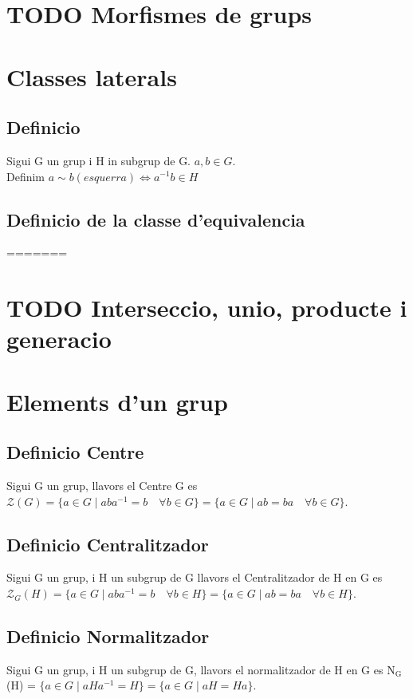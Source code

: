 \documentclass[11pt]{article}
\begin{document}
\section{{\bfseries\sffamily TODO} Morfismes de grups}
\label{sec:org1005c95}
\section{Classes laterals}
\label{sec:org1e25445}
\subsection{Definicio}
\label{sec:orgacf7c2a}
Sigui G un grup i H in subgrup de G. \(a,b \in G\). \\
Definim \(a \sim b (esquerra) \iff a^{-1}b \in H\)
\subsection{Definicio de la classe d'equivalencia}
\label{sec:org5a6b813}
=======
\label{sec:org654da55}
\section{{\bfseries\sffamily TODO} Interseccio, unio, producte i generacio}
\label{sec:orgeb1d7e2}
\section{Elements d'un grup}
\label{sec:orge2e4030}
\subsection{Definicio Centre}
\label{sec:org0ed0424}
Sigui G un grup, llavors el Centre G es \(\mathcal{Z}(G) = \{ a \in G \mid aba^{-1} = b \quad \forall b \in G \} = \{ a \in G \mid ab = ba \quad \forall b \in G \}\).

\subsection{Definicio Centralitzador}
\label{sec:org470512c}
Sigui G un grup, i H un subgrup de G llavors el Centralitzador de H en G es \(\mathcal{Z}_{G}(H) = \{ a \in G \mid aba^{-1} = b \quad \forall b \in H \} = \{ a \in G \mid ab = ba \quad \forall b \in H \}\).

\subsection{Definicio Normalitzador}
\label{sec:org4cdd146}
Sigui G un grup, i H un subgrup de G, llavors el normalitzador de H en G es N\(_{\text{G}}\)(H) = \(\{ a \in G \mid aHa^{-1} = H \} = \{ a \in G \mid aH = Ha \}\).
\end{document}

